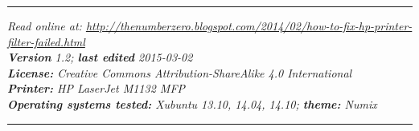 \documentclass[12pt, a4paper]{article}
\begin{document}






\newpage
\vspace{4cm}
\hrule
\noindent \center \emph{Read online at: \url{http://thenumberzero.blogspot.com/2014/02/how-to-fix-hp-printer-filter-failed.html}\\
\textbf{Version} 1.2; \textbf{last edited} 2015-03-02\\
\textbf{License:} Creative Commons Attribution-ShareAlike 4.0 International\\
\textbf{Printer:} HP LaserJet M1132 MFP\\
\textbf{Operating systems tested:} Xubuntu 13.10, 14.04, 14.10; \textbf{theme:} Numix}
\vspace{1em}
\hrule
\end{document}

